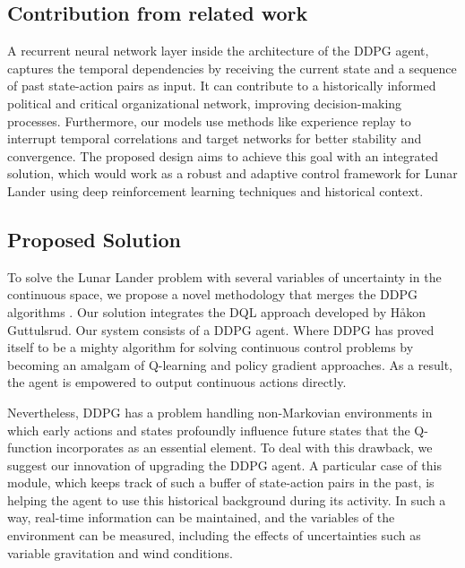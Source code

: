 \documentclass[conference]{IEEEtran}
\begin{document}
\subsection{Contribution from related work}
A recurrent neural network layer inside the architecture of the DDPG agent, captures the temporal dependencies by receiving the current state and a sequence of past state-action pairs as input. It can contribute to a historically informed political and critical organizational network, improving decision-making processes. Furthermore, our models use methods like experience replay to interrupt temporal correlations and target networks for better stability and convergence\cite{li2017deep}. The proposed design aims to achieve this goal with an integrated solution, which would work as a robust and adaptive control framework for Lunar Lander using deep reinforcement learning techniques and historical context.

\subsection{Proposed Solution}
To solve the Lunar Lander problem with several variables of uncertainty in the continuous space, we propose a novel methodology that merges the DDPG algorithms \cite{arxivContinuousControl}. Our solution integrates the DQL approach developed by Håkon Guttulsrud\cite{guttulsrud2023solving}. Our system consists of a DDPG agent. Where DDPG has proved itself to be a mighty algorithm for solving continuous control problems by becoming an amalgam of Q-learning and policy gradient approaches. As a result, the agent is empowered to output continuous actions directly.

Nevertheless, DDPG has a problem handling non-Markovian environments in which early actions and states profoundly influence future states that the Q-function incorporates as an essential element. To deal with this drawback, we suggest our innovation of upgrading the DDPG agent. A particular case of this module, which keeps track of such a buffer of state-action pairs in the past, is helping the agent to use this historical background during its activity. In such a way, real-time information can be maintained, and the variables of the environment can be measured, including the effects of uncertainties such as variable gravitation and wind conditions\cite{hazrathosseini2024transition}.
\end{document}
